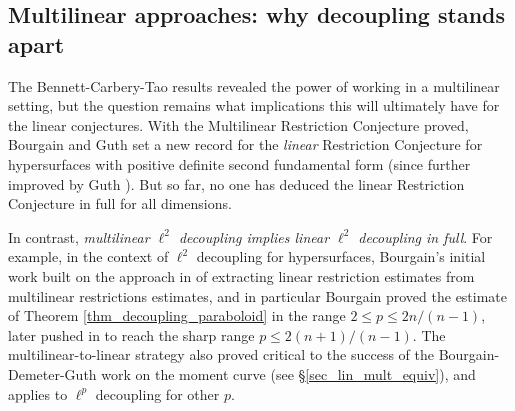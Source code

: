 \documentclass[brochure,english,12pt]{bourbaki}%
\begin{document}
\subsection{Multilinear approaches: why  decoupling stands apart}\label{sec_lin_mult_ideas}
The Bennett-Carbery-Tao results revealed the power of working in a multilinear setting, but the question remains what implications this will ultimately have for the linear conjectures. With the Multilinear Restriction Conjecture proved, Bourgain and Guth \cite{BouGut11} set a new record for the \emph{linear} Restriction Conjecture for hypersurfaces with positive definite second fundamental form (since further improved by Guth \cite{Gut16, Gut16xb}). But so far, no one has deduced the linear Restriction Conjecture in full for all dimensions.

In contrast,  \emph{multilinear $\ell^2$ decoupling implies linear $\ell^2$ decoupling in full}. For example, in the context of $\ell^2$ decoupling for hypersurfaces, Bourgain's initial work \cite{Bou13} built on the approach in \cite{BouGut11} of extracting linear restriction estimates from multilinear restrictions estimates, and in particular Bourgain proved the estimate of Theorem \ref{thm_decoupling_paraboloid} in the range $2 \leq p \leq 2n/(n-1)$, later pushed in \cite{BouDem15}  to reach the sharp range $p \leq 2(n+1)/(n-1)$. The multilinear-to-linear strategy also proved critical to the success of the Bourgain-Demeter-Guth work on the moment curve  (see \S \ref{sec_lin_mult_equiv}), and applies to $\ell^p$ decoupling for other $p$.
\end{document}

